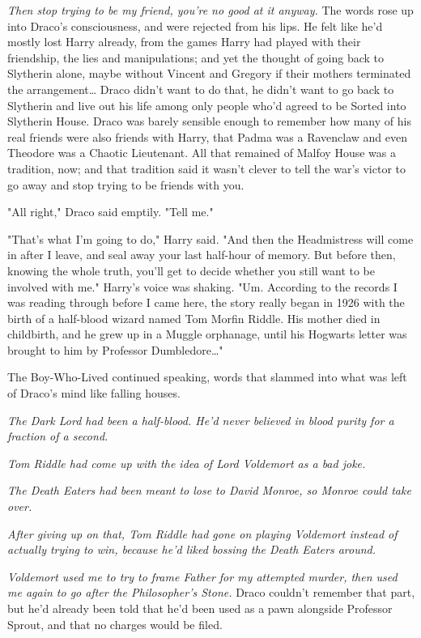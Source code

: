 \emph{Then stop trying to be my friend, you're no good at it anyway.} The words
rose up into Draco's consciousness, and were rejected from his lips. He felt
like he'd mostly lost Harry already, from the games Harry had played with their
friendship, the lies and manipulations; and yet the thought of going back to
Slytherin alone, maybe without Vincent and Gregory if their mothers terminated
the arrangement{\ldots} Draco didn't want to do that, he didn't want to go back
to Slytherin and live out his life among only people who'd agreed to be Sorted
into Slytherin House. Draco was barely sensible enough to remember how many of
his real friends were also friends with Harry, that Padma was a Ravenclaw and
even Theodore was a Chaotic Lieutenant. All that remained of Malfoy House was a
tradition, now; and that tradition said it wasn't clever to tell the war's
victor to go away and stop trying to be friends with you.

"All right," Draco said emptily. "Tell me."

"That's what I'm going to do," Harry said. "And then the Headmistress will come
in after I leave, and seal away your last half-hour of memory. But before then,
knowing the whole truth, you'll get to decide whether you still want to be
involved with me." Harry's voice was shaking. "Um. According to the records I
was reading through before I came here, the story really began in 1926 with the
birth of a half-blood wizard named Tom Morfin Riddle. His mother died in
childbirth, and he grew up in a Muggle orphanage, until his Hogwarts letter was
brought to him by Professor Dumbledore{\ldots}"

The Boy-Who-Lived continued speaking, words that slammed into what was left of
Draco's mind like falling houses.

\emph{The Dark Lord had been a half-blood. He'd never believed in blood purity
for a fraction of a second.}

\emph{Tom Riddle had come up with the idea of Lord Voldemort as a bad joke.}

\emph{The Death Eaters had been meant to lose to David Monroe, so Monroe could
take over.}

\emph{After giving up on that, Tom Riddle had gone on playing Voldemort instead
of actually trying to win, because he'd liked bossing the Death Eaters around.}

\emph{Voldemort used me to try to frame Father for my attempted murder, then
used me again to go after the Philosopher's Stone.} Draco couldn't remember
that part, but he'd already been told that he'd been used as a pawn alongside
Professor Sprout, and that no charges would be filed.

